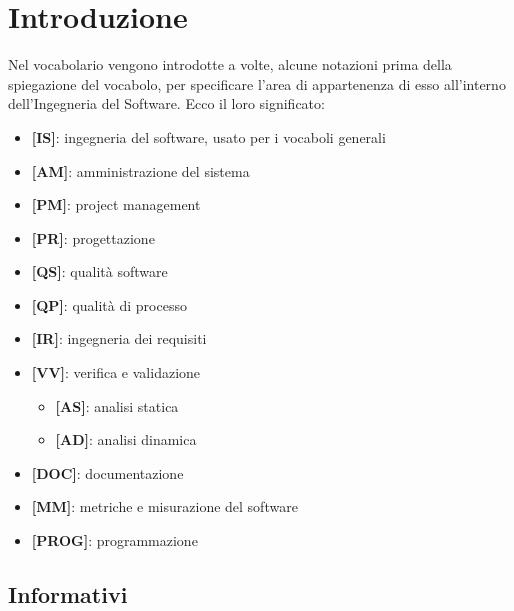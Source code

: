 %
%
%

\section{Introduzione} %
\label{sec:introduzione}
Nel vocabolario vengono introdotte a volte, alcune notazioni prima della spiegazione del vocabolo, per specificare l'area di appartenenza di esso all'interno dell'Ingegneria del Software. Ecco il loro significato:
	\begin{itemize}
		\item \textbf{[IS]}: ingegneria del software, usato per i vocaboli generali
		\item \textbf{[AM]}: amministrazione del sistema
		\item \textbf{[PM]}: project management
		\item \textbf{[PR]}: progettazione
		\item \textbf{[QS]}: qualità software
		\item \textbf{[QP]}: qualità di processo
		\item \textbf{[IR]}: ingegneria dei requisiti
		\item \textbf{[VV]}: verifica e validazione
			\begin{itemize}
				\item \textbf{[AS]}: analisi statica
				\item \textbf{[AD]}: analisi dinamica
			\end{itemize}
		\item \textbf{[DOC]}: documentazione
		\item \textbf{[MM]}: metriche e misurazione del software
		\item \textbf{[PROG]}: programmazione
	\end{itemize}

	\subsection{Informativi} %
	\label{sub:informativi}
